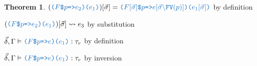 \documentclass[acmsmall]{acmart}
\theoremstyle{definition}
\newtheorem{theorem}{Theorem}[section]
\begin{document}
\begin{theorem}
        \item \Z\Z\Z $(\obj{($F$\$$p$=>$e_2$)($e_1$)})[\vec{\sigma}] = \obj{($F[\vec{\sigma}]$\$$p$=>$e[\vec{\sigma}\backslash\text{FV}(p)]$)($e_1[\vec{\sigma}]$)}
        $ by definition
        \item \Z\Z\Z $(\obj{($F$\$$p$=>$e_2$)($e_1$)})[\vec{\sigma}] \rightsquigarrow e_3$ by substitution 

        \item \Z\Z\Z $\vec{\delta}, \Gamma \satisfies \obj{($F$\$$p$=>$e$)($e_1$)} \hastype \tau_r$ by definition
      \item \Z\Z $\vec{\delta}, \Gamma \satisfies \obj{($F$\$$p$=>$e$)($e_1$)} \hastype \tau_r$ by inversion 



\end{theorem}
\end{document}
